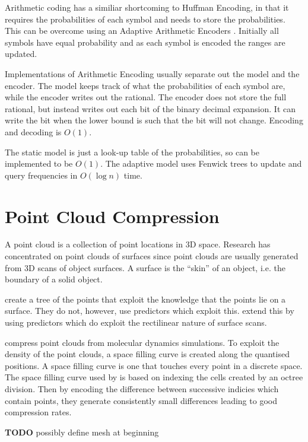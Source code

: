 \documentclass{report}
\newcommand{\todo}{\textbf{TODO} }
\begin{document}
Arithmetic coding has a similiar shortcoming to Huffman Encoding, in that it
requires the probabilities of each symbol and needs to store the
probabilities. This can be overcome using an Adaptive Arithmetic Encoders
\citep{drozdek}. Initially all symbols have equal probability and as each
symbol is encoded the ranges are updated.

Implementations of Arithmetic Encoding usually separate out the model and the
encoder. The model keeps track of what the probabilities of each symbol are,
while the encoder writes out the rational. The encoder does not store the full
rational, but instead writes out each bit of the binary decimal expansion. It
can write the bit when the lower bound is such that the bit will not
change. Encoding and decoding is $O(1)$.

The static model is just a look-up table of the probabilities, so can be
implemented to be $O(1)$. The adaptive model uses Fenwick trees to update and
query frequencies in $O(\log n)$ time.



\section{Point Cloud Compression}

A point cloud is a collection of point locations in 3D space. Research has
concentrated on point clouds of surfaces since point clouds are usually
generated from 3D scans of object surfaces. A surface is the ``skin'' of an
object, i.e. the boundary of a solid object.

\citep{gumholdcomp} create a tree of the points that exploit the knowledge that
the points lie on a surface. They do not, however, use predictors which
exploit this. \citep{merrycomp} extend this by using predictors which do
exploit the rectilinear nature of surface scans.

\citep{omeltchenko2000sls} compress point clouds from molecular dynamics
simulations. To exploit the density of the point clouds, a space filling curve
is created along the quantised positions. A space filling curve is one that
touches every point in a discrete space. The space filling curve used by
\citep{omeltchenko2000sls} is based on indexing the cells created by an octree
division. Then by encoding the difference between successive indicies which
contain points, they generate consistently small differences leading to good
compression rates.

\todo possibly define mesh at beginning
\end{document}

